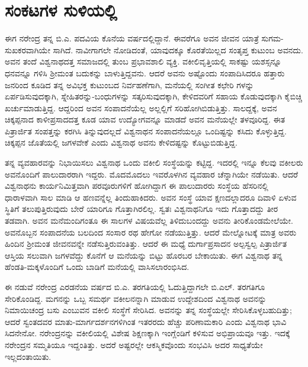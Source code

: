 
\chapter{ಸಂಕಟಗಳ ಸುಳಿಯಲ್ಲಿ}

\noindent

ಈಗ ನರೇಂದ್ರ ತನ್ನ ಬಿ.ಎ. ಪದವಿಯ ಕೊನೆಯ ವರ್ಷದಲ್ಲಿದ್ದಾನೆ. ಈವರೆಗೂ ಅವನ ಜೀವನ ಯಾತ್ರೆ ಸುಗಮ-ಸುಖಕರವಾಗಿಯೇ ಸಾಗಿದೆ. ನಾವೀಗಾಗಲೇ ನೋಡಿದಂತೆ, ಯಾವುದಕ್ಕೂ ಕೊರತೆಯಿಲ್ಲದ ಸಂತೃಪ್ತ ಕುಟುಂಬ ಅವನದು. ಅವನ ತಂದೆ ವಿಶ್ವನಾಥದತ್ತ ಸಮಾಜದಲ್ಲಿ ತುಂಬ ಪ್ರಭಾವಶಾಲಿ ವ್ಯಕ್ತಿ. ವಕೀಲಿವೃತ್ತಿಯಲ್ಲಿ ಸಾಕಷ್ಟು ಯಶಸ್ಸನ್ನೂ ಧನವನ್ನೂ ಗಳಿಸಿ ಶ್ರೀಮಂತ ಬದುಕನ್ನು ಬಾಳುತ್ತಿದ್ದವನು. ಆದರೆ ಅವನು ಅಷ್ಟೊಂದು ಸಂಪಾದಿಸಿದರೂ ಹತ್ತಾರು ಜನರಿಂದ ಕೂಡಿದ ತನ್ನ ಅವಿಭಕ್ತ ಕುಟುಂಬದ ನಿರ್ವಹಣೆಗಾಗಿ, ಮನೆಯಲ್ಲಿ ಸಂಗೀತ ಕಛೇರಿ ಗಳನ್ನು ಏರ್ಪಡಿಸುವುದಕ್ಕಾಗಿ, ಸ್ನೇಹಿತರನ್ನು-ಬಂಧುಗಳನ್ನು ಸತ್ಕರಿಸುವುದಕ್ಕಾಗಿ, ಕೇಳಿದವರಿಗೆ ಸಹಾಯ ಕೊಡುವುದಕ್ಕಾಗಿ ಕೈಬಿಚ್ಚಿ ಖರ್ಚುಮಾಡುತ್ತಿದ್ದ. ಆದ್ದರಿಂದ ಅವನ ಸಂಪಾದನೆಯೆಲ್ಲ ಅಲ್ಲಲ್ಲಿಗೆ ಸರಿಹೋಗಿಬಿಡುತ್ತಿತ್ತು. ಸಾಲದ್ದಕ್ಕೆ, ಅವನ ಚಿಕ್ಕಪ್ಪನಾದ ಕಾಳೀಪ್ರಸಾದದತ್ತ ಕೂಡ ಯಾವ ಉದ್ಯೋಗವನ್ನೂ ಮಾಡದೆ ಅವನ ಮನೆಯಲ್ಲೇ ತಳವೂರಿದ್ದ. ಈತ ಪಿತ್ರಾರ್ಜಿತ ಸಂಪತ್ತನ್ನು ಕರಗಿಸಿ ತಿನ್ನುವುದಲ್ಲದೆ ವಿಶ್ವನಾಥನ ಸಂಪಾದನೆಯಲ್ಲೂ ಒಂದಿಷ್ಟನ್ನು ಕಸಿದು ಕೊಳ್ಳುತ್ತಿದ್ದ. ಚಿಕ್ಕಪ್ಪನ ಜೊತೆಯಲ್ಲಿ ಜಗಳವೇಕೆ ಎಂದು ವಿಶ್ವನಾಥ ಅವನು ಕೇಳಿದಷ್ಟನ್ನು ಕೊಟ್ಟುಬಿಡುತ್ತಿದ್ದ.

ತನ್ನ ವ್ಯವಹಾರವನ್ನು ನಿಭಾಯಿಸಲು ವಿಶ್ವನಾಥ ಒಂದು ವಕೀಲಿ ಸಂಸ್ಥೆಯನ್ನು ಕಟ್ಟಿದ್ದ. ಇದರಲ್ಲಿ ಇನ್ನೂ ಕೆಲವು ವಕೀಲರು ಅವನೊಂದಿಗೆ ಪಾಲುದಾರರಾಗಿ ಇದ್ದರು. ಮೊದಮೊದಲು ಇವರೊಳಗಿನ ವ್ಯವಹಾರ ಚೆನ್ನಾಗಿಯೇ ನಡೆಯಿತು. ಆದರೆ ವಿಶ್ವನಾಥನು ಕಾರ್ಯನಿಮಿತ್ತವಾಗಿ ಪರವೂರುಗಳಿಗೆ ಹೋಗಿದ್ದಾಗ ಈ ಪಾಲುದಾರರು ಸಂಸ್ಥೆಯ ಹೆಸರಿನಲ್ಲಿ ಧಾರಾಳವಾಗಿ ಸಾಲ ಮಾಡಿ ಆ ಹಣವನ್ನೆಲ್ಲ ತಿಂದುಹಾಕಿದರು. ಅವನ ಸಂಸ್ಥೆ ಯಾವ ಕ್ಷಣದಲ್ಲಾದರೂ ದಿವಾಳಿ ಏಳುವ ಸ್ಥಿತಿಗೆ ತಲುಪುತ್ತಿರುವುದು ಬೇರೆ ಯಾರಿಗೂ ಗೊತ್ತಾಗಿರಲಿಲ್ಲ. ಸ್ವತಃ ವಿಶ್ವನಾಥನಿಗೂ ಇದು ಗೊತ್ತಾದದ್ದು ತೀರ ತಡವಾಗಿ. ಅವನ ಮನೆಮಂದಿಗಂತೂ ಈ ಸಾಲಗಳ ವಿಷಯವೆಲ್ಲ ತಿಳಿದುಬಂದದ್ದು ಅವನು ತೀರಿಕೊಂಡಮೇಲೆಯೇ. ಅವನೊಬ್ಬನ ಸಂಪಾದನೆಯ ಬಲದಿಂದ ಸಂಸಾರ ರಥ ಹೇಗೋ ನಡೆಯುತ್ತಿತ್ತು. ಆದರೆ ಮೇಲ್ನೋಟಕ್ಕೆ ಮಾತ್ರ ಅವರು ಹಿಂದಿನ ಶ್ರೀಮಂತ ಜೀವನವನ್ನೇ ನಡೆಸುತ್ತಿರುವಂತಿತ್ತು. ಆದರೆ ಈ ಮಧ್ಯೆ ದುರ್ಗಾಪ್ರಸಾದನ ಅಲ್ಪಸ್ವಲ್ಪ ಪಿತ್ರಾರ್ಜಿತ ಆಸ್ತಿಯ ಸಲುವಾಗಿ ಜಗಳವೆದ್ದು ಕೊನೆಗೆ ಆ ಮನೆಯನ್ನು ಬಿಟ್ಟು ಹೊರಬರ ಬೇಕಾಯಿತು. ಈಗ ವಿಶ್ವನಾಥ ತನ್ನ ಹೆಂಡತಿ-ಮಕ್ಕಳೊಂದಿಗೆ ಒಂದು ಬಾಡಿಗೆ ಮನೆಯಲ್ಲಿ ವಾಸಿಸಲಾರಂಭಿಸಿದ.

ಈ ನಡುವೆ ನರೇಂದ್ರ ಎರಡನೆಯ ವರ್ಷದ ಬಿ.ಎ. ತರಗತಿಯಲ್ಲಿ ಓದುತ್ತಿದ್ದಾಗಲೇ ಬಿ.ಎಲ್. ತರಗತಿಗೂ ಸೇರಿಕೊಂಡಿದ್ದ. ಮಗನನ್ನು ಒಬ್ಬ ಸಮರ್ಥ ವಕೀಲನನ್ನಾಗಿ ಮಾಡುವ ಉದ್ದೇಶದಿಂದ ವಿಶ್ವನಾಥ ಅವನನ್ನು ನಿಮಾಯಿಚಂದ್ರ ಬಸು ಎಂಬುವನ ವಕೀಲಿ ಸಂಸ್ಥೆಗೆ ಸೇರಿಸಿದ. ಅವನನ್ನು ತನ್ನ ಸಂಸ್ಥೆಯಲ್ಲೇ ಸೇರಿಸಿಕೊಳ್ಳಬಹುದಿತ್ತು; ಆದರೆ ಸ್ವಂತದವರ ಮಾತು-ಮಾರ್ಗದರ್ಶನಗಳಿಗಿಂತ ಇತರರದು ಹೆಚ್ಚು ಪರಿಣಾಮಕಾರಿ ಎಂದು ವಿಶ್ವನಾಥ ಭಾವಿ ಸಿದನೇನೋ. ನರೇಂದ್ರನನ್ನು ವಕೀಲಿಯಲ್ಲಿ ವಿಶೇಷ ಶಿಕ್ಷಣಕ್ಕಾಗಿ ಇಂಗ್ಲೆಂಡಿಗೆ ಕಳಿಸುವ ಅಭಿಪ್ರಾಯವೂ ಇತ್ತು. ಇದಕ್ಕೆ ನರೇಂದ್ರನ ಸಮ್ಮತಿಯೂ ಇದ್ದಂತಿತ್ತು. ಅದರೆ ಅಷ್ಟರಲ್ಲೇ ಆಕಸ್ಮಿಕವೊಂದು ಸಂಭವಿಸಿ ಅದರ ಸಾಧ್ಯತೆಯೇ ಇಲ್ಲದಂತಾಯಿತು.

